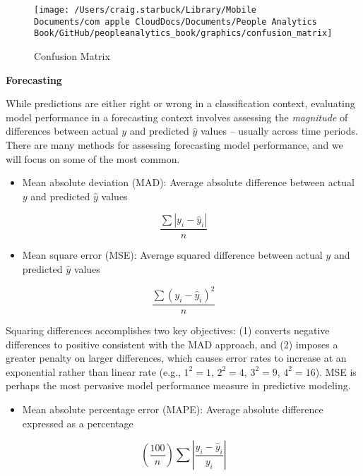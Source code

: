 \documentclass[
]{book}
\providecommand{\tightlist}{%
  \setlength{\itemsep}{0pt}\setlength{\parskip}{0pt}}
\begin{document}
\begin{figure}

{\centering \texttt{[image: /Users/craig.starbuck/Library/Mobile Documents/com~apple~CloudDocs/Documents/People Analytics Book/GitHub/peopleanalytics\_book/graphics/confusion\_matrix]} 

}

\caption{Confusion Matrix}\label{fig:confusion-mtx}
\end{figure}

\textbf{Forecasting}

While predictions are either right or wrong in a classification context, evaluating model performance in a forecasting context involves assessing the \emph{magnitude} of differences between actual \(y\) and predicted \(\hat y\) values -- usually across time periods. There are many methods for assessing forecasting model performance, and we will focus on some of the most common.

\begin{itemize}
\tightlist
\item
  Mean absolute deviation (MAD): Average absolute difference between actual \(y\) and predicted \(\hat y\) values
\end{itemize}

\[ \frac{\sum|y_i - \hat y_i|}{n} \]

\begin{itemize}
\tightlist
\item
  Mean square error (MSE): Average squared difference between actual \(y\) and predicted \(\hat y\) values
\end{itemize}

\[ \frac{\sum(y_i - \hat y_i)^2}{n} \]

Squaring differences accomplishes two key objectives: (1) converts negative differences to positive consistent with the MAD approach, and (2) imposes a greater penalty on larger differences, which causes error rates to increase at an exponential rather than linear rate (e.g., \(1^2 = 1\), \(2^2 = 4\), \(3^2 = 9\), \(4^2 = 16\)). MSE is perhaps the most pervasive model performance measure in predictive modeling.

\begin{itemize}
\tightlist
\item
  Mean absolute percentage error (MAPE): Average absolute difference expressed as a percentage
\end{itemize}

\[ (\frac{100}{n})\sum|\frac{y_i - \hat y_i}{y_i}| \]
\end{document}
